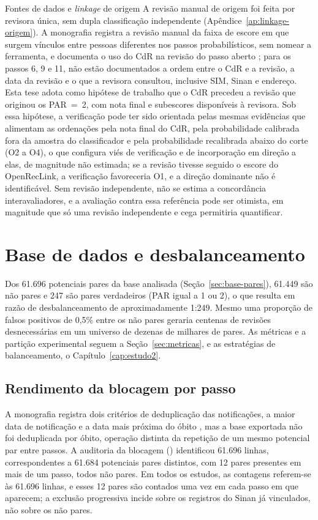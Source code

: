 \begin{chapter}{Fontes de dados e \textit{linkage} de origem}
A revisão manual de origem foi feita por revisora única, sem dupla classificação independente (Apêndice~\ref{ap:linkage-origem}). A monografia registra a revisão manual da faixa de escore em que surgem vínculos entre pessoas diferentes nos passos probabilísticos, sem nomear a ferramenta, e documenta o uso do CdR na revisão do passo aberto \cite[p.~34 e~39]{Oliveira2026obitoTBpulmonar}; para os passos 6, 9 e 11, não estão documentados a ordem entre o CdR e a revisão, a data da revisão e o que a revisora consultou, inclusive SIM, Sinan e endereço. Esta tese adota como hipótese de trabalho que o CdR precedeu a revisão que originou os PAR~=~2, com nota final e subescores disponíveis à revisora. Sob essa hipótese, a verificação pode ter sido orientada pelas mesmas evidências que alimentam as ordenações pela nota final do CdR, pela probabilidade calibrada fora da amostra do classificador e pela probabilidade recalibrada abaixo do corte (O2 a O4), o que configura viés de verificação e de incorporação em direção a elas, de magnitude não estimada; se a revisão tivesse seguido o escore do OpenRecLink, a verificação favoreceria O1, e a direção dominante não é identificável. Sem revisão independente, não se estima a concordância interavaliadores, e a avaliação contra essa referência pode ser otimista, em magnitude que só uma revisão independente e cega permitiria quantificar.

\section{Base de dados e desbalanceamento}\label{sec:dados-desbalanceamento}

Dos 61.696 potenciais pares da base analisada (Seção~\ref{sec:base-pares}), 61.449 são não pares e 247 são pares verdadeiros (PAR igual a 1 ou 2), o que resulta em razão de desbalanceamento de aproximadamente 1:249. Mesmo uma proporção de falsos positivos de 0,5\% entre os não pares geraria centenas de revisões desnecessárias em um universo de dezenas de milhares de pares. As métricas e a partição experimental seguem a Seção~\ref{sec:metricas}, e as estratégias de balanceamento, o Capítulo~\ref{cap:estudo2}.

\subsection{Rendimento da blocagem por passo}
\label{sec:blocagem-rendimento}

A monografia registra dois critérios de deduplicação das notificações, a maior data de notificação e a data mais próxima do óbito \cite[p.~41 e resumo]{Oliveira2026obitoTBpulmonar}, mas a base exportada não foi deduplicada por óbito, operação distinta da repetição de um mesmo potencial par entre passos. A auditoria da blocagem () identificou 61.696 linhas, correspondentes a 61.684 potenciais pares distintos, com 12 pares presentes em mais de um passo, todos não pares. Em todos os estudos, as contagens referem-se às 61.696 linhas, e esses 12 pares são contados uma vez em cada passo em que aparecem; a exclusão progressiva incide sobre os registros do Sinan já vinculados, não sobre os não pares.


\end{chapter}
